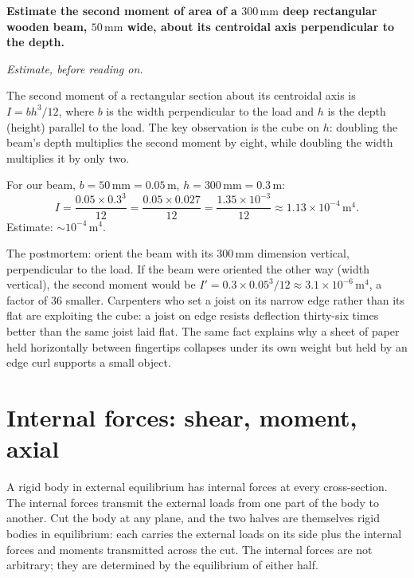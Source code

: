 \begin{estimation}
\textbf{Estimate the second moment of area of a $300 \,\si{\milli
\meter}$ deep rectangular wooden beam, $50\,\si{\milli\meter}$ wide,
about its centroidal axis perpendicular to the depth.}

\smallskip
\textit{Estimate, before reading on.}

\smallskip
The second moment of a rectangular section about its centroidal
axis is $I = bh^3 / 12$, where $b$ is the width perpendicular to
the load and $h$ is the depth (height) parallel to the load. The
key observation is the cube on $h$: doubling the beam's depth
multiplies the second moment by eight, while doubling the width
multiplies it by only two.

For our beam, $b = 50\,\si{\milli\meter} = 0.05\,\si{\meter}$,
$h = 300\,\si{\milli\meter} = 0.3\,\si{\meter}$:
\[
I = \frac{0.05 \times 0.3^3}{12} =
\frac{0.05 \times 0.027}{12} =
\frac{1.35 \times 10^{-3}}{12} \approx
1.13 \times 10^{-4} \,\si{\meter\tothe{4}}.
\]
Estimate: $\sim 10^{-4} \,\si{\meter\tothe{4}}$.

The postmortem: orient the beam with its $300\,\si{\milli\meter}$
dimension vertical, perpendicular to the load. If the beam were
oriented the other way (width vertical), the second moment would be
$I' = 0.3 \times 0.05^3 / 12 \approx 3.1 \times 10^{-6}\,\si{\meter
\tothe{4}}$, a factor of $36$ smaller. Carpenters who set a joist on
its narrow edge rather than its flat are exploiting the cube: a
joist on edge resists deflection thirty-six times better than the
same joist laid flat. The same fact explains why a sheet of paper
held horizontally between fingertips collapses under its own weight
but held by an edge curl supports a small object.
\end{estimation}

\section{Internal forces: shear, moment, axial}

A rigid body in external equilibrium has internal forces at every
cross-section. The internal forces transmit the external loads from
one part of the body to another. Cut the body at any plane, and the
two halves are themselves rigid bodies in equilibrium: each carries
the external loads on its side plus the internal forces and
moments transmitted across the cut. The internal forces are not
arbitrary; they are determined by the equilibrium of either half.


